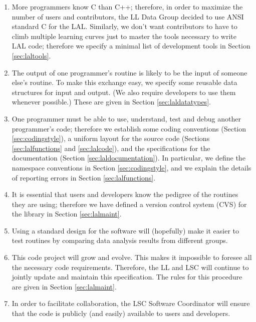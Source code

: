 \documentclass[]{ligodcc}
\begin{document}
\begin{enumerate}
\item 
More programmers know C than C++; therefore, in order to
maximize the  number of users and  contributors, the  LL Data Group
decided to use ANSI standard C  for the LAL. Similarly, we don't
want contributors to have to climb multiple learning curves just to
master the tools necessary to write LAL code; therefore we specify a
minimal list of development tools in Section \ref{sec:laltools}.

\item
The output of one programmer's routine is likely to be the
input of someone else's  routine. To make this exchange easy,  we
specify some reusable  data structures for input and output. (We also
require developers to use them whenever possible.) These are given in
Section  \ref{sec:laldatatypes}.

\item
One programmer must be able to use, understand, test and debug another
programmer's code; therefore we establish some coding conventions
(Section \ref{sec:codingstyle}),  a uniform layout for the source code
(Sections \ref{sec:lalfunctions} and \ref{sec:lalcode}),  and the
specifications for the documentation (Section
\ref{sec:laldocumentation}). In particular, we
define the  namespace conventions  in Section \ref{sec:codingstyle}, and  we explain the
details of  reporting errors in Section \ref{sec:lalfunctions}. 

\item
It is essential that users and developers know the pedigree of
the routines they are using; therefore we have defined a version
control system (CVS) for the library in Section \ref{sec:lalmaint}.  

\item
Using a standard design for the software will (hopefully)
make it easier to test routines by comparing data analysis results
from different groups.
	
\item
This code project will grow and evolve. This  makes  it
impossible to foresee all the necessary code requirements. Therefore,
the LL and LSC will continue to jointly update and maintain this
specification. The rules for this procedure are given in Section
\ref{sec:lalmaint}.

\item
In order to facilitate collaboration, the LSC Software
Coordinator will ensure that  the code is publicly (and easily)
available to users and developers.

\end{enumerate}
\end{document}
